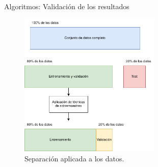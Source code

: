\documentclass{beamer}
\begin{document}
\begin{frame}{Algoritmos: Validación de los resultados}

	\begin{figure}[H]
		 \centering
		 \includegraphics[width=0.6\textwidth]{separacion_train_test.png}
		 \caption{Separación aplicada a los datos.}
		 \label{fig:separacion_train_test}
	\end{figure}

\end{frame}
\end{document}

